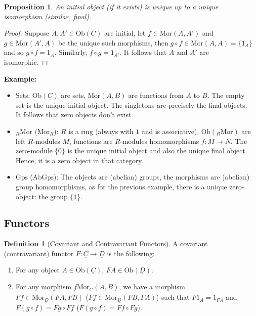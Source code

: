 \documentclass{article}
\theoremstyle{plain}
\newtheorem{proposition}[theorem]{Proposition}
\theoremstyle{definition}
\newtheorem*{definition}{Definition}
\newenvironment{example}{\noindent\textbf{Example:} \vspace{-0.2cm}\begin{itemize}}{\end{itemize}}
\begin{document}
\begin{proposition}
    An initial object (if it exists) is unique up to a unique isomorphism (similar, final).
\end{proposition}

\begin{proof}
    Suppose $A, A' \in \text{Ob}(\underline{C})$ are initial, let $f \in \text{Mor}(A,A')$ and $g \in \text{Mor}(A', A)$ be the unique such morphisms, then $g \circ f \in \text{Mor}(A,A) = \{1_A\}$ and so $g \circ f = 1_A$. Similarly, $f \circ g = 1_{A'}$. It follows that $A$ and $A'$ are isomorphic.
\end{proof}

\begin{example}
    \item Sets: $\text{Ob}(\underline{C})$ are sets, $\text{Mor}(A,B)$ are functions from $A$ to $B$. The empty set is the unique initial object. The singletons are precisely the final objects. It follows that zero objects don't exist.
    \item ${}_{R}\text{Mor}$ ($\text{Mor}_R$): $R$ is a ring (always with $1$ and is associative), $\text{Ob}({}_{R}\text{Mor})$ are left $R$-modules $M$, functions are $R$-modules homomorphisms $f : M \to N$. The zero-module $\{0\}$ is the unique initial object and also the unique final object. Hence, it is a zero object in that category.
    \item $\text{Gps}$ ($\text{AbGps}$): The objects are (abelian) groups, the morphisms are (abelian) group homomorphisms, as for the previous example, there is a unique zero-object: the group $\{1\}$.
\end{example}

\subsection{Functors}

\begin{definition}[Covariant and Contravariant Functors]
    A covariant (contravariant) functor $F : \underline{C} \to \underline{D}$ is the following:
    \begin{enumerate}
        \item For any object $A \in \text{Ob}(\underline{C})$, $FA \in \text{Ob}(\underline{D})$.
        \item For any morphism $f \text{Mor}_{\underline{C}}(A,B)$, we have a morphism $Ff \in \text{Mor}_{\underline{D}}(FA,FB)$ ($Ff \in \text{Mor}_{\underline{D}}(FB,FA)$) such that $F1_A = 1_{FA}$ and $F(g \circ f) = Fg \circ Ff$ ($F(g \circ f) = Ff \circ Fg$).
    \end{enumerate}
\end{definition}
\end{document}
